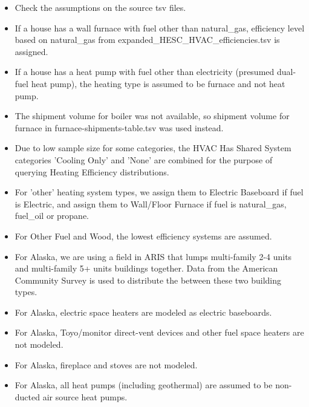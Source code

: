 \begin{itemize}
\item Check the assumptions on the source tsv files.
\item If a house has a wall furnace with fuel other than natural\_gas, efficiency level based on natural\_gas from expanded\_HESC\_HVAC\_efficiencies.tsv is assigned.
\item If a house has a heat pump with fuel other than electricity (presumed dual-fuel heat pump), the heating type is assumed to be furnace and not heat pump.
\item The shipment volume for boiler was not available, so shipment volume for furnace in furnace-shipments-table.tsv was used instead.
\item Due to low sample size for some categories, the HVAC Has Shared System categories 'Cooling Only' and 'None' are combined for the purpose of querying Heating Efficiency distributions.
\item For 'other' heating system types, we assign them to Electric Baseboard if fuel is Electric, and assign them to Wall/Floor Furnace if fuel is natural\_gas, fuel\_oil or propane.
\item For Other Fuel and Wood, the lowest efficiency systems are assumed.
\item For Alaska, we are using a field in ARIS that lumps multi-family 2-4 units and multi-family 5+ units buildings together. Data from the American Community Survey is used to distribute the between these two building types.
\item For Alaska, electric space heaters are modeled as electric baseboards.
\item For Alaska, Toyo/monitor direct-vent devices and other fuel space heaters are not modeled.
\item For Alaska, fireplace and stoves are not modeled.
\item For Alaska, all heat pumps (including geothermal) are assumed to be non-ducted air source heat pumps.
\end{itemize}
